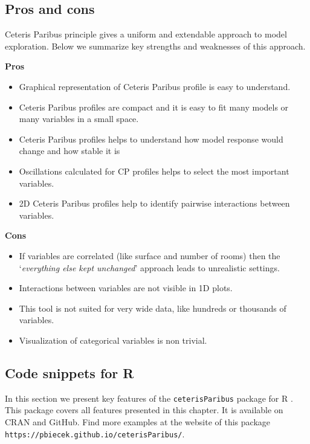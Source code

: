 \documentclass[]{krantz}
\providecommand{\tightlist}{%
  \setlength{\itemsep}{0pt}\setlength{\parskip}{0pt}}
\theoremstyle{definition}
\theoremstyle{definition}
\theoremstyle{definition}
\theoremstyle{remark}
\begin{document}
\hypertarget{pros-and-cons-5}{%
\subsection{Pros and cons}\label{pros-and-cons-5}}

Ceteris Paribus principle gives a uniform and extendable approach to
model exploration. Below we summarize key strengths and weaknesses of
this approach.

\textbf{Pros}

\begin{itemize}
\tightlist
\item
  Graphical representation of Ceteris Paribus profile is easy to
  understand.
\item
  Ceteris Paribus profiles are compact and it is easy to fit many models
  or many variables in a small space.
\item
  Ceteris Paribus profiles helps to understand how model response would
  change and how stable it is
\item
  Oscillations calculated for CP profiles helps to select the most
  important variables.
\item
  2D Ceteris Paribus profiles help to identify pairwise interactions
  between variables.
\end{itemize}

\textbf{Cons}

\begin{itemize}
\tightlist
\item
  If variables are correlated (like surface and number of rooms) then
  the `\emph{everything else kept unchanged}' approach leads to
  unrealistic settings.
\item
  Interactions between variables are not visible in 1D plots.
\item
  This tool is not suited for very wide data, like hundreds or thousands
  of variables.
\item
  Visualization of categorical variables is non trivial.
\end{itemize}

\hypertarget{code-snippets-for-r-4}{%
\subsection{Code snippets for R}\label{code-snippets-for-r-4}}

In this section we present key features of the \texttt{ceterisParibus}
package for R \citep{R-ceterisParibus}. This package covers all features
presented in this chapter. It is available on CRAN and GitHub. Find more
examples at the website of this package
\texttt{https://pbiecek.github.io/ceterisParibus/}.
\end{document}
